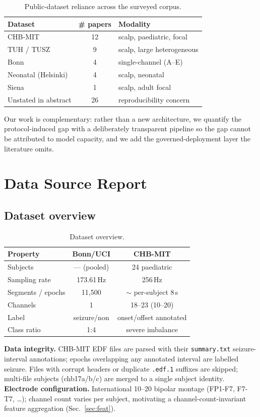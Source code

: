 \documentclass[10pt,journal,twocolumn]{IEEEtran}
\begin{document}
\begin{table}[h]\centering\caption{Public-dataset reliance across the surveyed corpus.}\label{tab:dsuse}
\begin{tabular}{lcl}\toprule
Dataset & \# papers & Modality\\\midrule
CHB-MIT & 12 & scalp, paediatric, focal\\
TUH / TUSZ & 9 & scalp, large heterogeneous\\
Bonn & 4 & single-channel (A--E)\\
Neonatal (Helsinki) & 4 & scalp, neonatal\\
Siena & 1 & scalp, adult focal\\
Unstated in abstract & 26 & reproducibility concern\\\bottomrule
\end{tabular}\end{table}

Our work is complementary: rather than a new architecture, we quantify the protocol-induced gap with a deliberately transparent pipeline so the gap cannot be attributed to model capacity, and we add the governed-deployment layer the literature omits.

\section{Data Source Report}
\subsection{Dataset overview}
\begin{table}[h]\centering\caption{Dataset overview.}\label{tab:dsov}
\begin{tabular}{lcc}\toprule
Property & Bonn/UCI & CHB-MIT\\\midrule
Subjects & --- (pooled) & 24 paediatric\\
Sampling rate & 173.61\,Hz & 256\,Hz\\
Segments / epochs & 11{,}500 & $\sim$ per-subject 8\,s\\
Channels & 1 & 18--23 (10--20)\\
Label & seizure/non & onset/offset annotated\\
Class ratio & 1:4 & severe imbalance\\\bottomrule
\end{tabular}\end{table}
\textbf{Data integrity.} CHB-MIT EDF files are parsed with their \texttt{summary.txt} seizure-interval annotations; epochs overlapping any annotated interval are labelled seizure. Files with corrupt headers or duplicate \texttt{.edf.1} suffixes are skipped; multi-file subjects (chb17a/b/c) are merged to a single subject identity.
\textbf{Electrode configuration.} International 10--20 bipolar montage (FP1-F7, F7-T7, \ldots); channel count varies per subject, motivating a channel-count-invariant feature aggregation (Sec.~\ref{sec:feat}).
\end{document}
